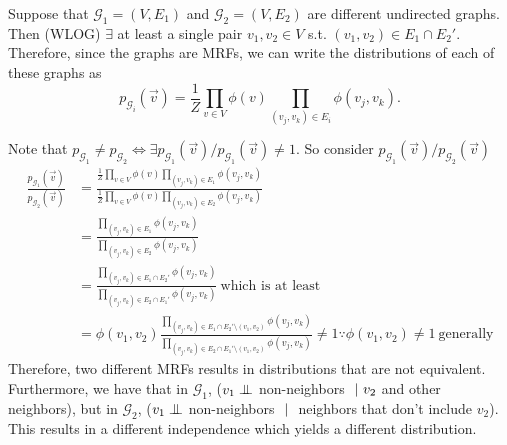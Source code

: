 \newcommand{\Graph}{\mathcal{G}}
\tftrue 

Suppose that $\Graph_1 = (V, E_1)$ and $\Graph_2 = (V, E_2)$ are different undirected graphs. Then (WLOG) $\exists$ at least a single pair $v_1, v_2 \in V$ s.t. $(v_1, v_2) \in E_1 \cap E_2'$. Therefore, since the graphs are MRFs, we can write the distributions of each of these graphs as
$$
p_{\Graph_i}(\vec{v}) = \frac{1}{Z} \prod_{v \in V} \phi(v) \prod_{(v_j, v_k) \in E_i} \phi(v_j, v_k).
$$

Note that $p_{\Graph_1} \neq p_{\Graph_2} \iff \exists p_{\Graph_1}(\vec{v})/p_{\Graph_1}(\vec{v}) \neq 1 $. So consider $p_{\Graph_1}(\vec{v})/p_{\Graph_2}(\vec{v})$
\begin{align*}
    \frac{p_{\Graph_1}(\vec{v})}{p_{\Graph_2}(\vec{v})} &= \frac{\frac{1}{Z} \prod_{v \in V} \phi(v) \prod_{(v_j, v_k) \in E_1} \phi(v_j, v_k)}{\frac{1}{Z} \prod_{v \in V} \phi(v) \prod_{(v_j, v_k) \in E_2} \phi(v_j, v_k)}\\
        &= \frac{\prod_{(v_j, v_k) \in E_1} \phi(v_j, v_k)}{\prod_{(v_j, v_k) \in E_2} \phi(v_j, v_k)}\\
        &= \frac{\prod_{(v_j, v_k) \in E_1\cap E_2'} \phi(v_j, v_k)}{\prod_{(v_j, v_k) \in E_2\cap E_1'} \phi(v_j, v_k)} ~\text{which is at least}\\
        &= \phi(v_1, v_2) \frac{\prod_{(v_j, v_k) \in E_1\cap E_2'\setminus(v_1, v_2)} \phi(v_j, v_k)}{\prod_{(v_j, v_k) \in E_2\cap E_1'\setminus(v_1, v_2)} \phi(v_j, v_k)} \neq 1 \because \phi(v_1, v_2) \neq 1 ~\text{generally}
\end{align*}
Therefore, two different MRFs results in distributions that are not equivalent. Furthermore, we have that in $\Graph_1$, ($v_1 \mathrel{\perp\mkern-10mu\perp} $ non-neighbors $~\vert~ v_2$ and other neighbors), but in $\Graph_2$, ($v_1 \mathrel{\perp\mkern-10mu\perp}$ non-neighbors $~\vert~$ neighbors that don't include $v_2$). This results in a different independence which yields a different distribution.

